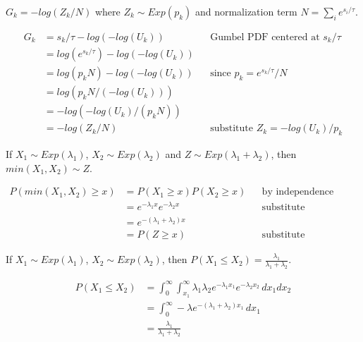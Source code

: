 \documentclass{article}
\begin{document}
\begin{lemma}
\label{g-z-equiv}
$G_k = -log(Z_k / N)$ where $Z_k \sim Exp(p_k)$ and normalization term $N = \sum_i e^{s_i / \tau}$.
\end{lemma}
\begin{align*}
    G_k &= s_k / \tau - log(-log(U_k)) &&\text{Gumbel PDF centered at } s_k / \tau \\
    &= log(e^{s_k / \tau}) - log(-log(U_k)) \\
    &= log(p_k N) - log(-log(U_k)) &&\text{since } p_k = e^{s_k / \tau} / N \\
    &= log(p_k N / (-log(U_k))) \\
    &= -log(-log(U_k) / (p_k N)) \\
    &= -log(Z_k / N) &&\text{substitute $Z_k = -log(U_k) / p_k$}
\end{align*}

\begin{lemma}
\label{exp-min}
If $X_1 \sim Exp(\lambda_1)$, $X_2 \sim Exp(\lambda_2)$ and $Z \sim Exp(\lambda_1 + \lambda_2)$, then $min(X_1, X_2) \sim Z$.
\end{lemma}
\begin{align*}
    P(min(X_1, X_2) \geq x) &= P(X_1 \geq x)P(X_2 \geq x) &&\text{by independence} \\
    &= e^{-\lambda_1x}e^{-\lambda_2x} &&\text{substitute exponential density} \\
    &= e^{-(\lambda_1 + \lambda_2)x} \\
    &= P(Z \geq x) &&\text{substitute exponential density}
\end{align*}


\begin{lemma}
\label{exp-comp}
If $X_1 \sim Exp(\lambda_1)$, $X_2 \sim Exp(\lambda_2)$, then $P(X_1 \leq X_2) = \frac{\lambda_1}{\lambda_1 + \lambda_2}$.

\begin{align*}
    P(X_1 \leq X_2) &= \int_0^\infty \int_{x_1}^\infty \lambda_1 \lambda_2 e^{-\lambda_1 x_1} e^{-\lambda_2 x_2} \,dx_1 dx_2 \\
    &= \int_0^\infty -\lambda e^{-(\lambda_1 + \lambda_2) x_1} \,dx_1 \\
    &= \frac{\lambda_1}{\lambda_1 + \lambda_2}
\end{align*}

\end{lemma}
\end{document}
